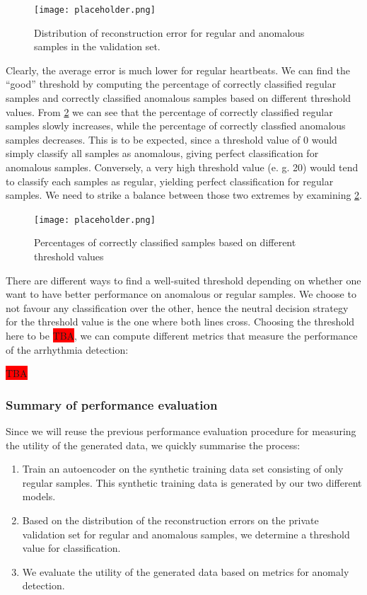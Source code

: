 \begin{figure}[h]
    \centering
    \texttt{[image: placeholder.png]}
    \caption{Distribution of reconstruction error for regular and anomalous samples in the validation set.}
    \label{fig:distr_err_baseline}
\end{figure}
Clearly, the average error is much lower for regular heartbeats. We can find the ``good'' threshold by computing the percentage of correctly classified regular samples and correctly classified anomalous samples based on different threshold values. From \cref{fig:thres_baseline} we can see that the percentage of correctly classified regular samples slowly increases, while the percentage of correctly classfied anomalous samples decreases. This is to be expected, since a threshold value of 0 would simply classify all samples as anomalous, giving perfect classification for anomalous samples. Conversely, a very high threshold value (e. g. 20) would tend to classify each samples as regular, yielding perfect classification for regular samples. We need to strike a balance between those two extremes by examining \cref{fig:thres_baseline}.

\begin{figure}[h]
    \centering
    \texttt{[image: placeholder.png]}
    \caption{Percentages of correctly classified samples based on different threshold values}
    \label{fig:thres_baseline}
\end{figure}

There are different ways to find a well-suited threshold depending on whether one want to have better performance on anomalous or regular samples. We choose to not favour any classification over the other, hence the neutral decision strategy for the threshold value is the one where both lines cross. Choosing the threshold here to be \colorbox{red}{TBA}, we can compute different metrics that measure the performance of the arrhythmia detection:

\colorbox{red}{TBA}


\subsubsection*{Summary of performance evaluation}
Since we will reuse the previous performance evaluation procedure for measuring the utility of the generated data, we quickly summarise the process:
\begin{enumerate} \label{list:anom_eval}
    \item Train an autoencoder on the synthetic training data set consisting of only regular samples. This synthetic training data is generated by our two different models.
    \item Based on the distribution of the reconstruction errors on the private validation set for regular and anomalous samples, we determine a threshold value for classification.
    \item We evaluate the utility of the generated data based on metrics for anomaly detection.
\end{enumerate}

